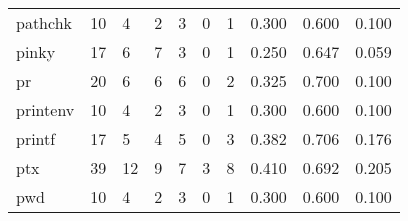 \begin{longtable}{lp{2.0cm}p{2.0cm}p{2.0cm}p{2.0cm}p{2.0cm}p{2.0cm}p{2.0cm}p{2.0cm}p{2.0cm}}
pathchk   &                     10 &                                             4 &                                            2 &                                           3 &                                            0 &                                          1 &                                0.300 &                                  0.600 &                                0.100 \\
pinky     &                     17 &                                             6 &                                            7 &                                           3 &                                            0 &                                          1 &                                0.250 &                                  0.647 &                                0.059 \\
pr        &                     20 &                                             6 &                                            6 &                                           6 &                                            0 &                                          2 &                                0.325 &                                  0.700 &                                0.100 \\
printenv  &                     10 &                                             4 &                                            2 &                                           3 &                                            0 &                                          1 &                                0.300 &                                  0.600 &                                0.100 \\
printf    &                     17 &                                             5 &                                            4 &                                           5 &                                            0 &                                          3 &                                0.382 &                                  0.706 &                                0.176 \\
ptx       &                     39 &                                            12 &                                            9 &                                           7 &                                            3 &                                          8 &                                0.410 &                                  0.692 &                                0.205 \\
pwd       &                     10 &                                             4 &                                            2 &                                           3 &                                            0 &                                          1 &                                0.300 &                                  0.600 &                                0.100 \\

\end{longtable}
